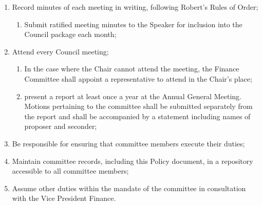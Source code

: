 \begin{enumerate}[label*=\arabic*., align=left]
\begin{enumerate}[label*=\arabic*., align=left]
\begin{enumerate}[label*=\arabic*., align=left]
		\item Record minutes of each meeting in writing, following Robert's Rules of Order;
		\begin{enumerate}[label*=\arabic*., align=left]
			\item Submit ratified meeting minutes to the Speaker for inclusion into the Council package each month;
			\end{enumerate}
		\item Attend every Council meeting;
		\begin{enumerate}[label*=\arabic*., align=left] 
			\item In the case where the Chair cannot attend the meeting, the Finance Committee shall appoint a representative to attend in the Chair's place;
			\item present a report at least once a year at the Annual General Meeting. Motions pertaining to the committee shall be submitted separately from the report and shall be accompanied by a statement including names of proposer and seconder;
			\end{enumerate}
		\item Be responsible for ensuring that committee members execute their duties;
		\item Maintain committee records, including this Policy document, in a repository accessible to all committee members;
		\item Assume other duties within the mandate of the committee in consultation with the Vice President Finance.
		\end{enumerate}
	\end{enumerate}
\end{enumerate}

